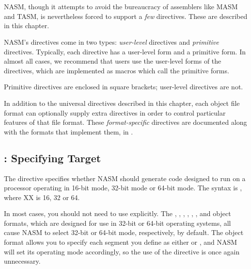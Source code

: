 \chapter{}
\label{ch:directive}

NASM, though it attempts to avoid the bureaucracy of assemblers like
MASM and TASM, is nevertheless forced to support a \emph{few}
directives. These are described in this chapter.

NASM's directives come in two types: 
\emph{user-level} directives and 
\emph{primitive} directives. Typically, each directive has a
user-level form and a primitive form. In almost all cases, we
recommend that users use the user-level forms of the directives,
which are implemented as macros which call the primitive forms.

Primitive directives are enclosed in square brackets; user-level
directives are not.

In addition to the universal directives described in this chapter,
each object file format can optionally supply extra directives in
order to control particular features of that file format. These
\emph{format-specific} directives are
documented along with the formats that implement them, in
.

\section{: Specifying Target }
\label{sec:bits}

The  directive specifies whether NASM should generate code
designed to run on a processor
operating in 16-bit mode, 32-bit mode or 64-bit mode. The syntax is
, where XX is 16, 32 or 64.

In most cases, you should not need to use  explicitly. The
, , , , ,
,  and  object formats, which
are designed for use in 32-bit or 64-bit operating systems, all cause
NASM to select 32-bit or 64-bit mode, respectively, by default.
The  object format allows you to specify each segment
you define as either  or , and NASM will
set its operating mode accordingly, so the use of the 
directive is once again unnecessary.


